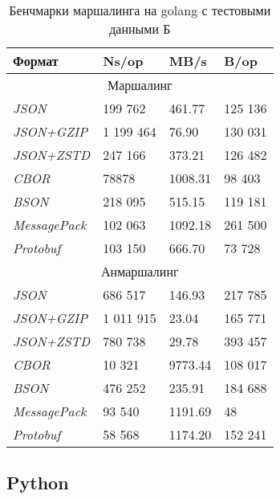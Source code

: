 \begin{table}[ht!]
\centering
\caption{Бенчмарки маршалинга на golang с тестовыми данными Б}
\begin{tabular}{|l|l|l|l|} 
\hline
\textbf{Формат}      & \textbf{Ns/op} & \textbf{MB/s} & \textbf{B/op}  \\ 
\hline
\multicolumn{4}{|c|}{Маршалинг}                                        \\ 
\hline
\textit{JSON}        & 199 762         & 461.77        & 125 136         \\ 
\hline
\textit{JSON+GZIP}   & 1 199 464        & 76.90         & 130 031         \\ 
\hline
\textit{JSON+ZSTD}   & 247 166         & 373.21        & 126 482         \\ 
\hline
\textit{CBOR}        & 78878          & 1008.31       & 98 403          \\ 
\hline
\textit{BSON}        & 218 095         & 515.15        & 119 181         \\ 
\hline
\textit{MessagePack} & 102 063         & 1092.18       & 261 500         \\ 
\hline
\textit{Protobuf}    & 103 150         & 666.70        & 73 728          \\ 
\hline
\multicolumn{4}{|c|}{Анмаршалинг}                                      \\ 
\hline
\textit{JSON}        & 686 517         & 146.93        & 217 785         \\ 
\hline
\textit{JSON+GZIP}   & 1 011 915        & 23.04         & 165 771         \\ 
\hline
\textit{JSON+ZSTD}   & 780 738         & 29.78         & 393 457         \\ 
\hline
\textit{CBOR}        & 10 321          & 9773.44       & 108 017         \\ 
\hline
\textit{BSON}        & 476 252         & 235.91        & 184 688         \\ 
\hline
\textit{MessagePack} & 93 540          & 1191.69       & 48             \\ 
\hline
\textit{Protobuf}    & 58 568          & 1174.20       & 152 241         \\
\hline
\end{tabular}
\end{table}


\clearpage

\subsection{Python}

